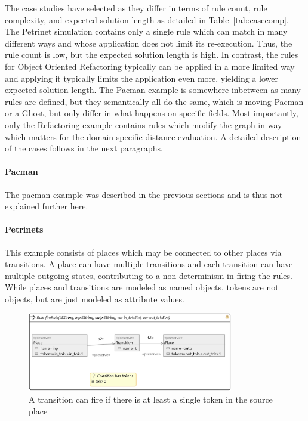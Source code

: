 The case studies have selected as they differ in terms of rule count, rule complexity, and expected solution length as detailed in Table~\ref{tab:casecomp}.
The Petrinet simulation contains only a single rule which can match in many different ways and whose application does not limit its re-execution. Thus, the rule count is low, but the expected solution length is high. In contrast, the rules for Object Oriented Refactoring typically can be applied in a more limited way and applying it typically limits the application even more, yielding a lower expected solution length. The Pacman example is somewhere inbetween as many rules are defined, but they semantically all do the same, which is moving Pacman or a Ghost, but only differ in what happens on specific fields. 
Most importantly, only the Refactoring example contains rules which modify the graph in way which matters for the domain specific distance evaluation. A detailed description of the cases follows in the next paragraphs.


\paragraph{Pacman} The pacman example was described in the previous sections and is thus not explained further here.


\paragraph{Petrinets} 
This example consists of places which may be connected to other places via transitions. A place can have multiple transitions
and each transition can have multiple outgoing states, contributing to a non-determinism in firing the rules.
While places and transitions are modeled as named objects, tokens are not objects, but are just modeled as attribute values.


\begin{figure}
\includegraphics[width=0.8\textwidth]{images/firetransition.png}
\caption{A transition can fire if there is at least a single token in the source place}
\label{fig:firerule}
\end{figure}

